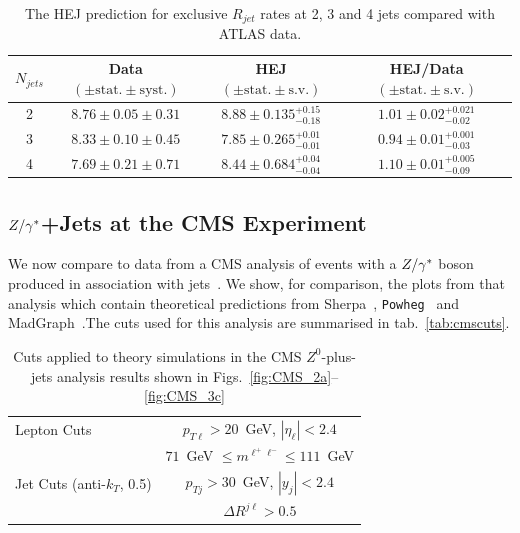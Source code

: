 		\begin{table}[!h]
			\begin{center}
			\begin{tabular}{| c | c | c | c |}
		        \hline
			$N_{jets}$ & Data $(\pm \text{stat.}\pm \text{syst.})$ & HEJ $(\pm \text{stat.}\pm \text{s.v.})$ & HEJ/Data $(\pm \text{stat.}\pm \text{s.v.})$ \\ \hline
			2 & $8.76\pm0.05\pm0.31$ & $8.88\pm0.135^{+0.15}_{-0.18}$ & $1.01\pm0.02^{+0.021}_{-0.02}$ \\ \hline
			3 & $8.33\pm0.10\pm0.45$ & $7.85\pm0.265^{+0.01}_{-0.01}$ & $0.94\pm0.01^{+0.001}_{-0.03}$ \\ \hline
			4 & $7.69\pm0.21\pm0.71$ & $8.44\pm0.684^{+0.04}_{-0.04}$ & $1.10\pm0.01^{+0.005}_{-0.09}$ \\ \hline
			\end{tabular}
			\caption{The HEJ prediction for exclusive $R_{jet}$ rates at 2, 3 and 4 jets compared with ATLAS data.}
			\label{tab:RJetsExcl}
			\end{center}
		\end{table}

	\subsection{$Z/\gamma^*$+Jets at the CMS Experiment}
		\label{sub:CMS}

		We now compare to data from a CMS analysis of events with a $Z/\gamma^*$ boson produced
		in association with jets~\cite{Khachatryan:2014zya}.  We show, for comparison,
		the plots from that analysis which contain theoretical predictions from
		Sherpa~\cite{Gleisberg:2008ta,Hoeche:2012yf}, \texttt{Powheg}~\cite{Alioli:2010qp} and
		MadGraph~\cite{Alwall:2014hca}.The cuts used for this analysis are summarised in
		tab.~\eqref{tab:cmscuts}.

		\begin{table}[hbt]
		  \centering
		  \begin{tabular}{|l|c|}
		    \hline
		    Lepton Cuts & $p_{T\ell}>20$~GeV, \; $|\eta_\ell|<2.4$ \\
		    &\; $71$~GeV $\leq m^{\ell^+\ell^-} \leq
		      111$~GeV \\ \hline
		    Jet Cuts (anti-$k_T$, 0.5) & $p_{Tj}>30$~GeV, \; $|y_j|<2.4$ \\
		    & $\Delta R^{j\ell} >0.5$ \\
		\hline
		  \end{tabular}
		  \caption{Cuts applied to theory simulations in the CMS
		    $Z^0$-plus-jets analysis results shown in
		    Figs.~\eqref{fig:CMS_2a}--\eqref{fig:CMS_3c}}
		  \label{tab:cmscuts}
		\end{table}

